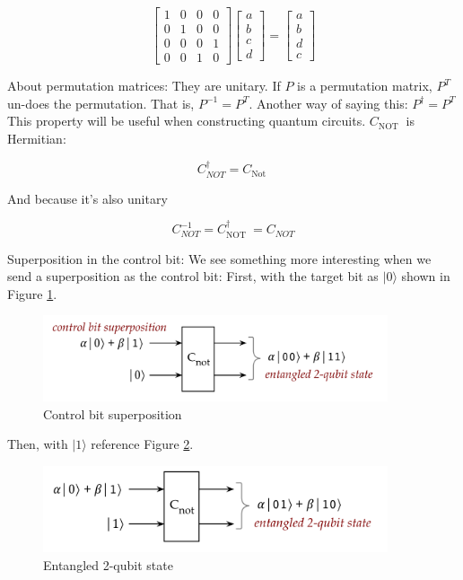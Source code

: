 \documentclass[main.tex]{subfiles}
\begin{document}
    $$
    \left[\begin{array}{llll}
    1 & 0 & 0 & 0 \\
    0 & 1 & 0 & 0 \\
    0 & 0 & 0 & 1 \\
    0 & 0 & 1 & 0
    \end{array}\right]\left[\begin{array}{l}
    a \\
    b \\
    c \\
    d
    \end{array}\right]=\left[\begin{array}{l}
    a \\
    b \\
    d \\
    c
    \end{array}\right]
    $$
    
    About permutation matrices: They are unitary. If $P$ is a permutation matrix, $P^{T}$ un-does the permutation. That is, $P^{-1}=P^{T}$. Another way of saying this: $P^{\dagger}=P^{T}$ This property will be useful when constructing quantum circuits. $C_{\text {NOT }}$ is Hermitian:
    
    $$
    C_{N O T}^{\dagger}=C_{\text {Not }}
    $$
    
    And because it's also unitary
    
    $$
    C_{N O T}^{-1}=C_{\text {NOT }}^{\dagger}=C_{N O T}
    $$
    
    Superposition in the control bit: We see something more interesting when we send a superposition as the control bit: First, with the target bit as $|0\rangle$ shown in Figure \ref{fig:18cnot1}.
    
    \begin{figure}
        \centering
        \includegraphics[width=4in]{notes/figs/n07/18cnot1.png}
        \caption{Control bit superposition}
        \label{fig:18cnot1}
    \end{figure}
    
    Then, with $|1\rangle$ reference Figure \ref{fig:19cnot2}.
    
    \begin{figure}
        \centering
        \includegraphics[width=4in]{notes/figs/n07/19cnot2.png}
        \caption{Entangled 2-qubit state}
        \label{fig:19cnot2}
    \end{figure}
    
\end{document}
